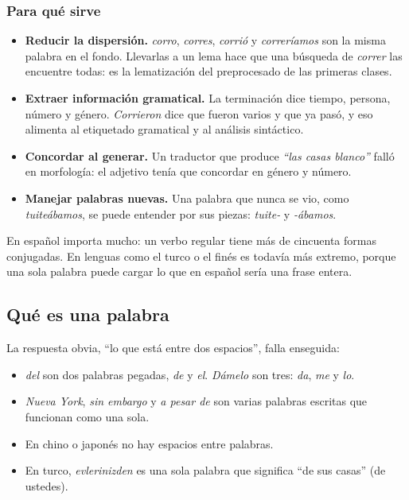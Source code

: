 \documentclass[11pt,letterpaper]{article}
\begin{document}
\subsubsection*{Para qué sirve}

\begin{itemize}[itemsep=0.3em]
    \item \textbf{Reducir la dispersión.} \textit{corro},
          \textit{corres}, \textit{corrió} y \textit{correríamos} son la
          misma palabra en el fondo. Llevarlas a un lema hace que una
          búsqueda de \textit{correr} las encuentre todas: es la
          lematización del preprocesado de las primeras clases.
    \item \textbf{Extraer información gramatical.} La terminación dice
          tiempo, persona, número y género. \textit{Corrieron} dice
          que fueron varios y que ya pasó, y eso alimenta al etiquetado
          gramatical y al análisis sintáctico.
    \item \textbf{Concordar al generar.} Un traductor que produce
          \textit{``las casas blanco''} falló en morfología: el
          adjetivo tenía que concordar en género y número.
    \item \textbf{Manejar palabras nuevas.} Una palabra que nunca se
          vio, como \textit{tuiteábamos}, se puede entender por sus
          piezas: \textit{tuite-} y \textit{-ábamos}.
\end{itemize}

En español importa mucho: un verbo regular tiene más de cincuenta
formas conjugadas. En lenguas como el turco o el finés es todavía más
extremo, porque una sola palabra puede cargar lo que en español sería
una frase entera.


\subsection*{Qué es una palabra}

La respuesta obvia, ``lo que está entre dos espacios'', falla
enseguida:

\begin{itemize}[itemsep=0.3em]
    \item \textit{del} son dos palabras pegadas, \textit{de} y
          \textit{el}. \textit{Dámelo} son tres: \textit{da},
          \textit{me} y \textit{lo}.
    \item \textit{Nueva York}, \textit{sin embargo} y \textit{a pesar
          de} son varias palabras escritas que funcionan como una sola.
    \item En chino o japonés no hay espacios entre palabras.
    \item En turco, \textit{evlerinizden} es una sola palabra que
          significa ``de sus casas'' (de ustedes).
\end{itemize}
\end{document}
